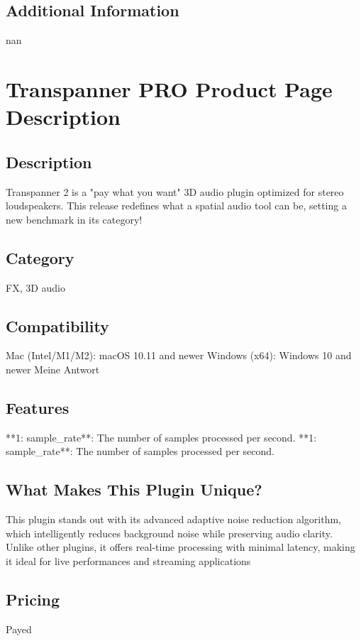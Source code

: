\documentclass[8pt]{article}
\begin{document}
    \subsection*{Additional Information}
    nan
    

    \section*{Transpanner PRO  Product Page Description}

    \subsection*{Description}
    Transpanner 2 is a "pay what you want" 3D audio plugin optimized for stereo loudspeakers. This release redefines what a spatial audio tool can be, setting a new benchmark in its category!

    \subsection*{Category}
    FX, 3D audio

    \subsection*{Compatibility}
    Mac (Intel/M1/M2): macOS 10.11 and newer
Windows (x64): Windows 10 and newer
Meine Antwort


    \subsection*{Features}
    **1: sample_rate**: The number of samples processed per second.
**1: sample_rate**: The number of samples processed per second.

    \subsection*{What Makes This Plugin Unique?}
    This plugin stands out with its advanced adaptive noise reduction algorithm, which intelligently reduces background noise while preserving audio clarity. Unlike other plugins, it offers real-time processing with minimal latency, making it ideal for live performances and streaming applications

    \subsection*{Pricing}
    Payed
\end{document}
